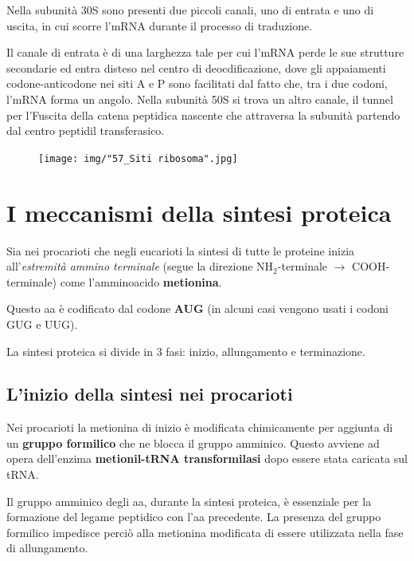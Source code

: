 \documentclass[11pt]{book}
\begin{document}
Nella subunità 30S sono presenti due piccoli canali, uno di entrata e
uno di uscita, in cui scorre l'mRNA durante il processo di traduzione.

Il canale di entrata è di una larghezza tale per cui l'mRNA perde le sue
strutture secondarie ed entra disteso nel centro di deocdificazione,
dove gli appaiamenti codone-anticodone nei siti A e P sono facilitati
dal fatto che, tra i due codoni, l'mRNA forma un angolo. Nella subunità
50S si trova un altro canale, il tunnel per l'Fuscita della catena
peptidica nascente che attraversa la subunità partendo dal centro
peptidil transferasico.

\begin{figure}[htp]
\centering
\texttt{[image: img/"57\_Siti ribosoma".jpg]}
\caption{}
\label{siti-ribosoma}
\end{figure}

\section{I meccanismi della sintesi
proteica}\label{i-meccanismi-della-sintesi-proteica}

Sia nei procarioti che negli eucarioti la sintesi di tutte le proteine
inizia all'\emph{estremità ammino terminale} (segue la direzione
NH\(_2\)-terminale \(\rightarrow\) COOH-terminale) come l'amminoacido
\textbf{metionina}.

Questo aa è codificato dal codone \textbf{AUG} (in alcuni casi vengono
usati i codoni GUG e UUG).

La sintesi proteica si divide in 3 fasi: inizio, allungamento e
terminazione.

\subsection{L'inizio della sintesi nei
procarioti}\label{linizio-della-sintesi-nei-procarioti}

Nei procarioti la metionina di inizio è modificata chimicamente per
aggiunta di un \textbf{gruppo formilico} che ne blocca il gruppo
amminico. Questo avviene ad opera dell'enzima \textbf{metionil-tRNA
transformilasi} dopo essere stata caricata sul tRNA.

Il gruppo amminico degli aa, durante la sintesi proteica, è essenziale
per la formazione del legame peptidico con l'aa precedente. La presenza
del gruppo formilico impedisce perciò alla metionina modificata di
essere utilizzata nella fase di allungamento.
\end{document}
